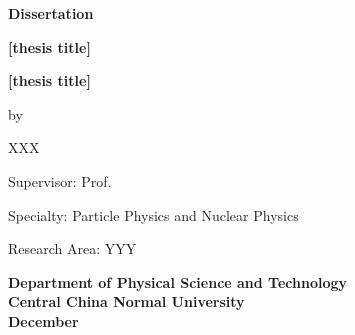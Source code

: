 \mbox{}\vspace{0.8cm}
\begin{center}
{ \bfseries {Dissertation}}
\end{center}
\vspace{2cm}
\begin{center}
{ \bfseries{[thesis title]}}
\end{center}
\begin{center}
{ \bfseries{[thesis title]}}
\end{center}

\vspace{0.35in}

\begin{center}
{\bfseries{
by
\vspace{0.22in}

XXX

\vspace{0.3in}

Supervisor: Prof. 

\vspace{0.3in}

Specialty: Particle Physics and Nuclear Physics

\vspace{0.3in}

Research Area: YYY

}}
\end{center}

\vspace{1.2in}

\begin{center}
{ \bfseries {Department of Physical Science and Technology}}\\
{ \bfseries {Central China Normal University}} \\
{ \vspace{0.5cm}  \bfseries{December} \hspace{0.2cm} \bfseries {\the\year} } %
\end{center}

\clearpage
